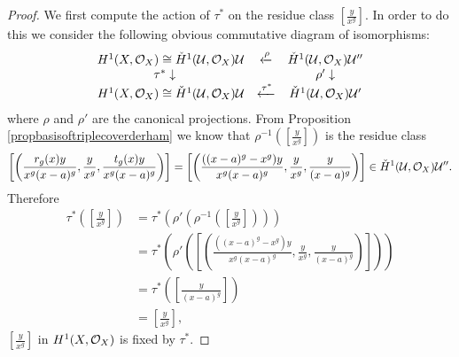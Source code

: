 \begin{proof}
    We first compute the action of $\tau^*$ on the residue class $\left[\frac{y}{x^g}\right]$.
    In order to do this we consider the following obvious commutative diagram of isomorphisms:
        \[
        \begin{array}{cccc}
        H^1(X,\mathcal{O}_X) \cong \check{H}^1(\mathcal U,\mathcal O_X){{\mathcal U}}  & \xleftarrow{\rho} & \check{H}^1(\mathcal U,\mathcal O_X){{\mathcal U}''}  \\
                \hspace{-1em}\tau^*\downarrow & ~ & \rho'\downarrow  \\
        H^1(X,\mathcal{O}_X) \cong \check{H}^1(\mathcal U,\mathcal O_X){{\mathcal U}}  & \xleftarrow{\tau^*} & \check{H}^1(\mathcal U,\mathcal O_X){{\mathcal U}'}
        \end{array}
        \]
    where $\rho$ and $\rho'$ are the canonical projections.
    From Proposition \ref{propbasisoftriplecoverderham} we know that $\rho^{-1} \left(\left[\frac{y}{x^g}\right]\right)$ is the residue class 
        \[
        \left[ \left( \frac{r_g(x)y}{x^g(x-a)^g}, \frac{y}{x^g}, \frac{t_g(x)y}{x^g(x-a)^g} \right)\right] = \left[ \left( \frac{((x-a)^g-x^g)y}{x^g(x-a)^g}, \frac{y}{x^g}, \frac{y}{(x-a)^g} \right) \right] \in \check{H}^1(\mathcal U,\mathcal O_X){{\mathcal U}''}.
        \]  
    Therefore 
        \begin{align*}
        \tau^* \left( \left[ \frac{y}{x^g} \right] \right)  & = \tau^* \left( \rho' \left(\rho^{-1}\left(\left[\frac{y}{x^g}\right]\right)\right)\right) \\
        & = \tau^*\left( \rho' \left( \left[ \left( \frac{((x-a)^g-x^g)y}{x^g(x-a)^g}, \frac{y}{x^g}, \frac{y}{(x-a)^g} \right) \right] \right) \right) \\
        & = \tau^*\left( \left[ \frac{y}{(x-a)^g} \right] \right) \\
        & = \left[ \frac{y}{x^g} \right],
        \end{align*}
    \ie $\left[ \frac{y}{x^g} \right]$ in $H^1(X,\mathcal{O}_X)$ is fixed by $\tau^*$.


\end{proof}
